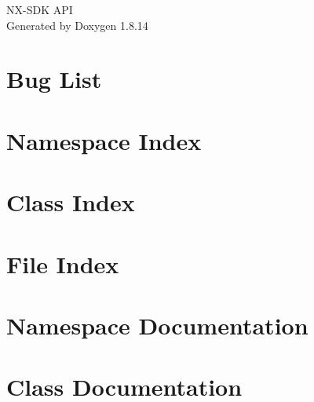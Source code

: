 \documentclass[twoside]{book}
\newcommand{\+}{\discretionary{\mbox{\scriptsize$\hookleftarrow$}}{}{}}
\newcommand{\clearemptydoublepage}{%
  \newpage{\pagestyle{empty}\cleardoublepage}%
}
\begin{document}
\hypersetup{pageanchor=false,
             bookmarksnumbered=true,
             pdfencoding=unicode
            }
\begin{titlepage}
\vspace*{7cm}
\begin{center}%
{\Large N\+X-\/\+S\+DK A\+PI }\\
\vspace*{1cm}
{\large Generated by Doxygen 1.8.14}\\
\end{center}
\end{titlepage}
\clearemptydoublepage
{}
\tableofcontents
\clearemptydoublepage
{}
\hypersetup{pageanchor=true}

\chapter{Bug List}
\label{bug}

\chapter{Namespace Index}

\chapter{Class Index}

\chapter{File Index}

\chapter{Namespace Documentation}

\chapter{Class Documentation}


























\end{document}
